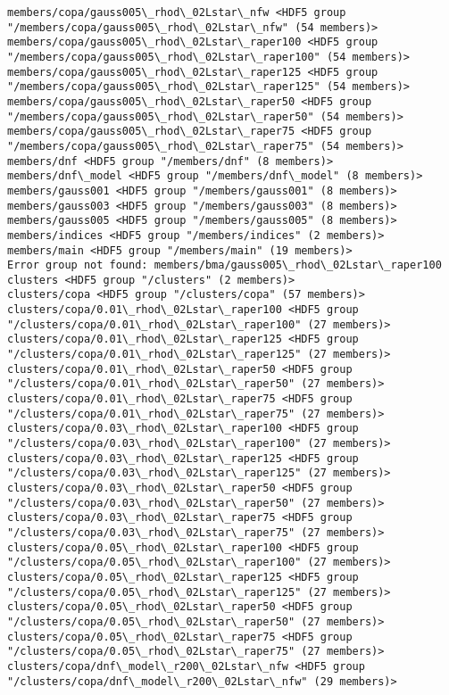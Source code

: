 \documentclass[11pt]{article}
\begin{document}
\begin{Verbatim}[commandchars=\\\{\}]
members/copa/gauss005\_rhod\_02Lstar\_nfw <HDF5 group "/members/copa/gauss005\_rhod\_02Lstar\_nfw" (54 members)>
members/copa/gauss005\_rhod\_02Lstar\_raper100 <HDF5 group "/members/copa/gauss005\_rhod\_02Lstar\_raper100" (54 members)>
members/copa/gauss005\_rhod\_02Lstar\_raper125 <HDF5 group "/members/copa/gauss005\_rhod\_02Lstar\_raper125" (54 members)>
members/copa/gauss005\_rhod\_02Lstar\_raper50 <HDF5 group "/members/copa/gauss005\_rhod\_02Lstar\_raper50" (54 members)>
members/copa/gauss005\_rhod\_02Lstar\_raper75 <HDF5 group "/members/copa/gauss005\_rhod\_02Lstar\_raper75" (54 members)>
members/dnf <HDF5 group "/members/dnf" (8 members)>
members/dnf\_model <HDF5 group "/members/dnf\_model" (8 members)>
members/gauss001 <HDF5 group "/members/gauss001" (8 members)>
members/gauss003 <HDF5 group "/members/gauss003" (8 members)>
members/gauss005 <HDF5 group "/members/gauss005" (8 members)>
members/indices <HDF5 group "/members/indices" (2 members)>
members/main <HDF5 group "/members/main" (19 members)>
Error group not found: members/bma/gauss005\_rhod\_02Lstar\_raper100
clusters <HDF5 group "/clusters" (2 members)>
clusters/copa <HDF5 group "/clusters/copa" (57 members)>
clusters/copa/0.01\_rhod\_02Lstar\_raper100 <HDF5 group "/clusters/copa/0.01\_rhod\_02Lstar\_raper100" (27 members)>
clusters/copa/0.01\_rhod\_02Lstar\_raper125 <HDF5 group "/clusters/copa/0.01\_rhod\_02Lstar\_raper125" (27 members)>
clusters/copa/0.01\_rhod\_02Lstar\_raper50 <HDF5 group "/clusters/copa/0.01\_rhod\_02Lstar\_raper50" (27 members)>
clusters/copa/0.01\_rhod\_02Lstar\_raper75 <HDF5 group "/clusters/copa/0.01\_rhod\_02Lstar\_raper75" (27 members)>
clusters/copa/0.03\_rhod\_02Lstar\_raper100 <HDF5 group "/clusters/copa/0.03\_rhod\_02Lstar\_raper100" (27 members)>
clusters/copa/0.03\_rhod\_02Lstar\_raper125 <HDF5 group "/clusters/copa/0.03\_rhod\_02Lstar\_raper125" (27 members)>
clusters/copa/0.03\_rhod\_02Lstar\_raper50 <HDF5 group "/clusters/copa/0.03\_rhod\_02Lstar\_raper50" (27 members)>
clusters/copa/0.03\_rhod\_02Lstar\_raper75 <HDF5 group "/clusters/copa/0.03\_rhod\_02Lstar\_raper75" (27 members)>
clusters/copa/0.05\_rhod\_02Lstar\_raper100 <HDF5 group "/clusters/copa/0.05\_rhod\_02Lstar\_raper100" (27 members)>
clusters/copa/0.05\_rhod\_02Lstar\_raper125 <HDF5 group "/clusters/copa/0.05\_rhod\_02Lstar\_raper125" (27 members)>
clusters/copa/0.05\_rhod\_02Lstar\_raper50 <HDF5 group "/clusters/copa/0.05\_rhod\_02Lstar\_raper50" (27 members)>
clusters/copa/0.05\_rhod\_02Lstar\_raper75 <HDF5 group "/clusters/copa/0.05\_rhod\_02Lstar\_raper75" (27 members)>
clusters/copa/dnf\_model\_r200\_02Lstar\_nfw <HDF5 group "/clusters/copa/dnf\_model\_r200\_02Lstar\_nfw" (29 members)>

\end{Verbatim}
\end{document}
